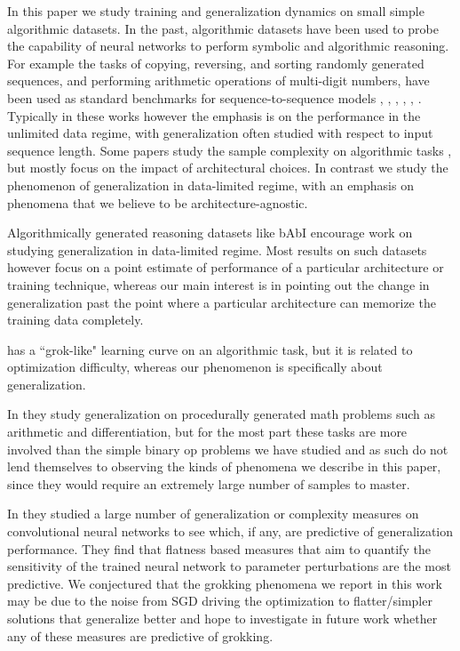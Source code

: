 \documentclass{article} %
\begin{document}
In this paper we study training and generalization dynamics on small simple algorithmic datasets. In the past, algorithmic datasets have been used to probe the capability of neural networks to perform symbolic and algorithmic reasoning. For example the tasks of copying, reversing, and sorting randomly generated sequences, and performing arithmetic operations of multi-digit numbers, have been used as standard benchmarks for sequence-to-sequence models \cite{neural_turing_machines}, \cite{memory_networks} \cite{neural_gpu} \cite{neural_programmer_interpreter}, \cite{learningtotransduce}, \cite{ntm_rl}, \cite{adaptive_computation_time}, \cite{universal_transformers}. Typically in these works however the emphasis is on the performance in the unlimited data regime, with generalization often studied with respect to input sequence length. Some papers study the sample complexity on algorithmic tasks \cite{neural_programmer_interpreter}, but mostly focus on the impact of architectural choices. In contrast we study the phenomenon of generalization in data-limited regime, with an emphasis on phenomena that we believe to be architecture-agnostic.

Algorithmically generated reasoning datasets like bAbI \cite{babi} encourage work on studying generalization in data-limited regime. Most results on such datasets however focus on a point estimate of performance of a particular architecture or training technique, whereas our main interest is in pointing out the change in generalization past the point where a particular architecture can memorize the training data completely.

\cite{gradient_noise} has a ``grok-like" learning curve on an algorithmic task, but it is related to optimization difficulty, whereas our phenomenon is specifically about generalization.

In \cite{dmmath} they study generalization on procedurally generated math problems such as arithmetic and  differentiation, but for the most part these tasks are more involved than the simple binary op problems we have studied and as such do not lend themselves to observing the kinds of phenomena we describe in this paper, since they would require an extremely large number of samples to master.

In \cite{fantastic_generalization_measures} they studied a large number of generalization or complexity measures on convolutional neural networks to see which, if any, are predictive of generalization performance. They find that flatness based measures that aim to quantify the sensitivity of the trained neural network to parameter perturbations are the most predictive. We conjectured that the grokking phenomena we report in this work may be due to the noise from SGD driving the optimization to flatter/simpler solutions that generalize better and hope to investigate in future work whether any of these measures are predictive of grokking.
\end{document}
